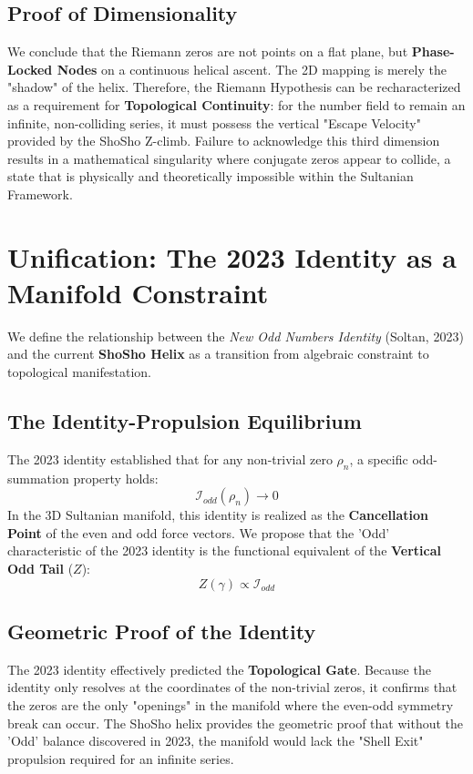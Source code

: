 \documentclass[11pt,a4paper]{article}
\begin{document}
\subsection{Proof of Dimensionality}
We conclude that the Riemann zeros are not points on a flat plane, but \textbf{Phase-Locked Nodes} on a continuous helical ascent. The 2D mapping is merely the "shadow" of the helix. Therefore, the Riemann Hypothesis can be recharacterized as a requirement for \textbf{Topological Continuity}: for the number field to remain an infinite, non-colliding series, it must possess the vertical "Escape Velocity" provided by the ShoSho Z-climb. Failure to acknowledge this third dimension results in a mathematical singularity where conjugate zeros appear to collide, a state that is physically and theoretically impossible within the Sultanian Framework.



\section{Unification: The 2023 Identity as a Manifold Constraint}

We define the relationship between the \textit{New Odd Numbers Identity} (Soltan, 2023) and the current \textbf{ShoSho Helix} as a transition from algebraic constraint to topological manifestation. 

\subsection{The Identity-Propulsion Equilibrium}
The 2023 identity established that for any non-trivial zero $\rho_n$, a specific odd-summation property holds:
\begin{equation}
    \mathcal{I}_{odd}(\rho_n) \to 0
\end{equation}
In the 3D Sultanian manifold, this identity is realized as the \textbf{Cancellation Point} of the even and odd force vectors. We propose that the 'Odd' characteristic of the 2023 identity is the functional equivalent of the \textbf{Vertical Odd Tail} ($Z$):
\begin{equation}
    Z(\gamma) \propto \mathcal{I}_{odd}
\end{equation}

\subsection{Geometric Proof of the Identity}
The 2023 identity effectively predicted the \textbf{Topological Gate}. Because the identity only resolves at the coordinates of the non-trivial zeros, it confirms that the zeros are the only "openings" in the manifold where the even-odd symmetry break can occur. The ShoSho helix provides the geometric proof that without the 'Odd' balance discovered in 2023, the manifold would lack the "Shell Exit" propulsion required for an infinite series.
\end{document}

